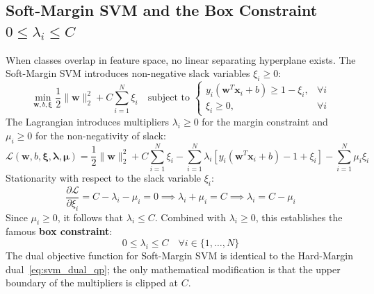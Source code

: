 \subsection{Soft-Margin SVM and the Box Constraint $0 \le \lambda_i \le C$}
When classes overlap in feature space, no linear separating hyperplane exists. The Soft-Margin SVM introduces non-negative slack variables $\xi_i \ge 0$:
\begin{equation}
\min_{\mathbf{w}, b, \boldsymbol{\xi}} \frac{1}{2}\|\mathbf{w}\|_2^2 + C \sum_{i=1}^N \xi_i \quad \text{subject to } \begin{cases} y_i(\mathbf{w}^T \mathbf{x}_i + b) \ge 1 - \xi_i, & \forall i \\ \xi_i \ge 0, & \forall i \end{cases}
\label{eq:soft_svm_primal}
\end{equation}
The Lagrangian introduces multipliers $\lambda_i \ge 0$ for the margin constraint and $\mu_i \ge 0$ for the non-negativity of slack:
\begin{equation}
\mathcal{L}(\mathbf{w}, b, \boldsymbol{\xi}, \boldsymbol{\lambda}, \boldsymbol{\mu}) = \frac{1}{2}\|\mathbf{w}\|_2^2 + C \sum_{i=1}^N \xi_i - \sum_{i=1}^N \lambda_i \left[ y_i(\mathbf{w}^T \mathbf{x}_i + b) - 1 + \xi_i \right] - \sum_{i=1}^N \mu_i \xi_i
\end{equation}
Stationarity with respect to the slack variable $\xi_i$:
\begin{equation}
\frac{\partial \mathcal{L}}{\partial \xi_i} = C - \lambda_i - \mu_i = 0 \implies \lambda_i + \mu_i = C \implies \lambda_i = C - \mu_i
\end{equation}
Since $\mu_i \ge 0$, it follows that $\lambda_i \le C$. Combined with $\lambda_i \ge 0$, this establishes the famous \textbf{box constraint}:
\begin{equation}
0 \le \lambda_i \le C \quad \forall i \in \{1, \dots, N\}
\label{eq:box_constraint}
\end{equation}
The dual objective function for Soft-Margin SVM is identical to the Hard-Margin dual~\eqref{eq:svm_dual_qp}; the only mathematical modification is that the upper boundary of the multipliers is clipped at $C$.

